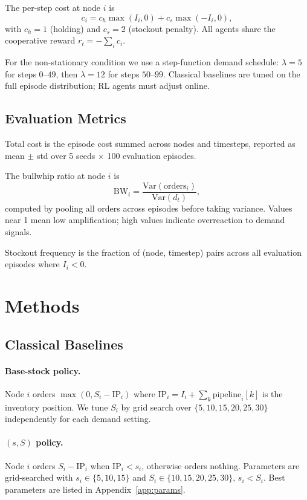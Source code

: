 \documentclass{article}
\begin{document}
The per-step cost at node $i$ is
\[
  c_i = c_h \max(I_i, 0) + c_s \max(-I_i, 0),
\]
with $c_h = 1$ (holding) and $c_s = 2$ (stockout penalty). All agents
share the cooperative reward $r_t = -\sum_i c_i$.

For the non-stationary condition we use a step-function demand schedule:
$\lambda = 5$ for steps $0$--$49$, then $\lambda = 12$ for steps
$50$--$99$. Classical baselines are tuned on the full episode
distribution; RL agents must adjust online.

\subsection{Evaluation Metrics}

Total cost is the episode cost summed across nodes and timesteps,
reported as mean $\pm$ std over 5 seeds $\times$ 100 evaluation
episodes.

The bullwhip ratio at node $i$ is
\[
  \text{BW}_i = \frac{\text{Var}(\text{orders}_i)}{\text{Var}(d_t)},
\]
computed by pooling all orders across episodes before taking variance.
Values near 1 mean low amplification; high values indicate overreaction
to demand signals.

Stockout frequency is the fraction of (node, timestep) pairs across all
evaluation episodes where $I_i < 0$.

\section{Methods}

\subsection{Classical Baselines}

\paragraph{Base-stock policy.}
Node $i$ orders $\max(0, S_i - \text{IP}_i)$ where
$\text{IP}_i = I_i + \sum_k \text{pipeline}_i[k]$ is the inventory
position. We tune $S_i$ by grid search over
$\{5, 10, 15, 20, 25, 30\}$ independently for each demand setting.

\paragraph{$(s,S)$ policy.}
Node $i$ orders $S_i - \text{IP}_i$ when $\text{IP}_i < s_i$,
otherwise orders nothing. Parameters are grid-searched with
$s_i \in \{5,10,15\}$ and $S_i \in \{10,15,20,25,30\}$, $s_i < S_i$.
Best parameters are listed in Appendix~\ref{app:params}.
\end{document}
